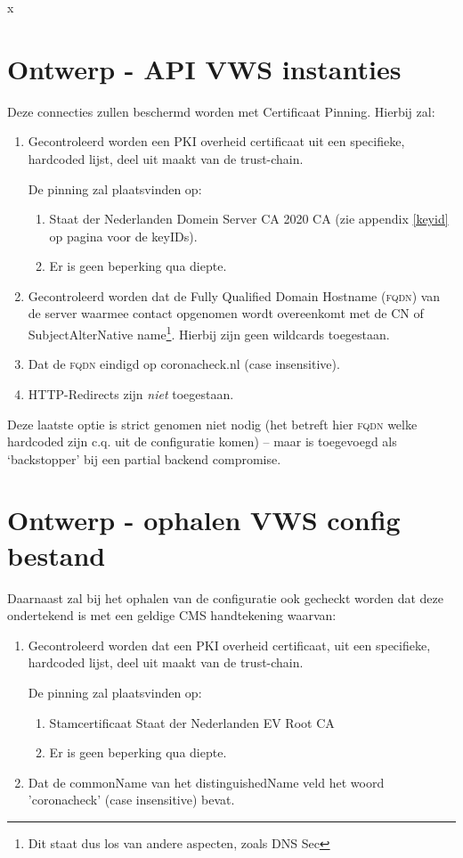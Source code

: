 \documentclass[11.0pt,twoside,openright]{report}
\def\testsonly{x}
\begin{document}
\ifdefined\testsonly
\else
\pagebreak
\section{Ontwerp - API VWS instanties}
\label{api}

Deze connecties zullen beschermd worden met Certificaat Pinning. Hierbij zal:

\begin{enumerate}
\item	Gecontroleerd worden een PKI overheid certificaat uit een specifieke, hardcoded lijst, deel uit maakt van de trust-chain.

De pinning zal plaatsvinden op:
\begin{enumerate}
\item Staat der Nederlanden Domein Server CA 2020 CA (zie appendix \ref{keyid} op pagina \pageref{keyid} voor de keyIDs).
\item Er is geen beperking qua diepte.
\end{enumerate}
\item 	Gecontroleerd worden dat de Fully Qualified Domain Hostname (\textsc{fqdn}) van de server waarmee contact opgenomen wordt overeenkomt met de CN of SubjectAlterNative name\footnote{Dit staat dus los van andere aspecten, zoals DNS Sec}. Hierbij zijn geen wildcards toegestaan. 
\item 	Dat de \textsc{fqdn} eindigd op coronacheck.nl (case insensitive).
\item HTTP-Redirects zijn \emph{niet} toegestaan.
\end{enumerate}

Deze laatste optie is strict genomen niet nodig (het betreft hier \textsc{fqdn} welke hardcoded zijn c.q. uit de configuratie komen) -- maar is toegevoegd als `backstopper' bij een partial backend compromise.

\section{Ontwerp - ophalen VWS config bestand}
\label{config}

Daarnaast zal bij het ophalen van de configuratie ook gecheckt worden dat deze ondertekend is met een geldige CMS handtekening waarvan:

\begin{enumerate}
\item	Gecontroleerd worden dat een PKI overheid certificaat, uit een specifieke, hardcoded lijst, deel uit maakt van de trust-chain.

De pinning zal plaatsvinden op:
\begin{enumerate}
\item Stamcertificaat Staat der Nederlanden EV Root CA
\item Er is geen beperking qua diepte.
\end{enumerate}
\item	Dat de commonName van het distinguishedName veld het woord 'coronacheck' (case insensitive) bevat.
\end{enumerate}
\end{document}
